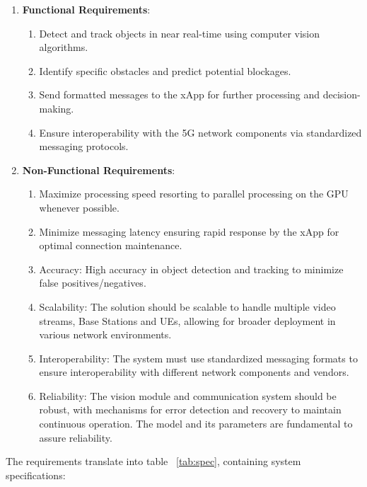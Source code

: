 \begin{enumerate}
    \item \textbf{Functional Requirements}:
    \begin{enumerate}
        \item Detect and track objects in near real-time using computer vision algorithms.
        \item Identify specific obstacles and predict potential blockages.
        \item Send formatted messages to the xApp for further processing and decision-making.
        \item Ensure interoperability with the 5G network components via standardized messaging protocols. %
    \end{enumerate}
    \item \textbf{Non-Functional Requirements}:
    \begin{enumerate}
        \item Maximize processing speed resorting to parallel processing on the GPU whenever possible\@.
        \item Minimize messaging latency ensuring rapid response by the xApp for optimal connection maintenance.
        \item Accuracy: High accuracy in object detection and tracking to minimize false positives/negatives.
        \item Scalability: The solution should be scalable to handle multiple video streams, Base Stations and UEs, allowing for broader deployment in various network environments.
        \item Interoperability: The system must use standardized messaging formats to ensure interoperability with different network components and vendors.
        \item Reliability: The vision module and communication system should be robust, with mechanisms for error detection and recovery to maintain continuous operation.
        The model and its parameters are fundamental to assure reliability. %
    \end{enumerate}
\end{enumerate}

The requirements translate into table ~\ref{tab:spec}, containing system specifications:

